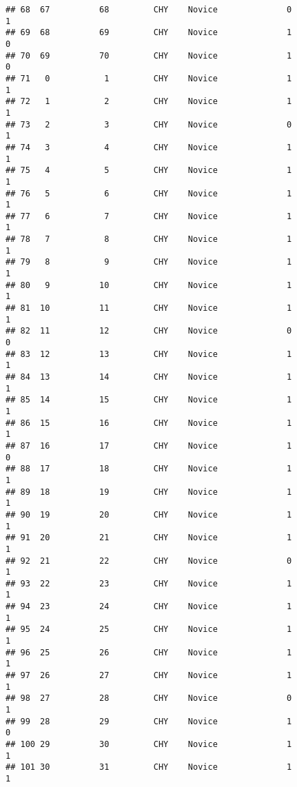 \documentclass[
]{article}
\begin{document}
\begin{verbatim}
## 68  67          68         CHY    Novice              0                 1
## 69  68          69         CHY    Novice              1                 0
## 70  69          70         CHY    Novice              1                 0
## 71   0           1         CHY    Novice              1                 1
## 72   1           2         CHY    Novice              1                 1
## 73   2           3         CHY    Novice              0                 1
## 74   3           4         CHY    Novice              1                 1
## 75   4           5         CHY    Novice              1                 1
## 76   5           6         CHY    Novice              1                 1
## 77   6           7         CHY    Novice              1                 1
## 78   7           8         CHY    Novice              1                 1
## 79   8           9         CHY    Novice              1                 1
## 80   9          10         CHY    Novice              1                 1
## 81  10          11         CHY    Novice              1                 1
## 82  11          12         CHY    Novice              0                 0
## 83  12          13         CHY    Novice              1                 1
## 84  13          14         CHY    Novice              1                 1
## 85  14          15         CHY    Novice              1                 1
## 86  15          16         CHY    Novice              1                 1
## 87  16          17         CHY    Novice              1                 0
## 88  17          18         CHY    Novice              1                 1
## 89  18          19         CHY    Novice              1                 1
## 90  19          20         CHY    Novice              1                 1
## 91  20          21         CHY    Novice              1                 1
## 92  21          22         CHY    Novice              0                 1
## 93  22          23         CHY    Novice              1                 1
## 94  23          24         CHY    Novice              1                 1
## 95  24          25         CHY    Novice              1                 1
## 96  25          26         CHY    Novice              1                 1
## 97  26          27         CHY    Novice              1                 1
## 98  27          28         CHY    Novice              0                 1
## 99  28          29         CHY    Novice              1                 0
## 100 29          30         CHY    Novice              1                 1
## 101 30          31         CHY    Novice              1                 1

\end{verbatim}
\end{document}

